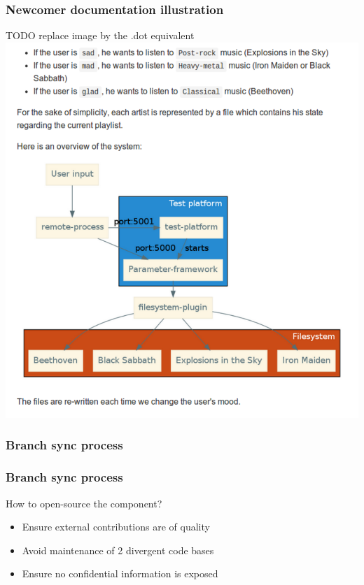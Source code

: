 \begin{frame}
    \frametitle{Newcomer documentation illustration}
    \centering
    TODO replace image by the .dot equivalent
    \includegraphics[height=0.85\textheight]{../../report/src/img/tutos.pdf}
\end{frame}

\subsubsection{Branch sync process}
\begin{frame}
    \frametitle{Branch sync process}
    \begin{block}{How to open-source the component?}
        \begin{itemize}
            \item Ensure external contributions are of quality
            \item Avoid maintenance of 2 divergent code bases
            \item Ensure no confidential information is exposed
        \end{itemize}
    \end{block}
\end{frame}

